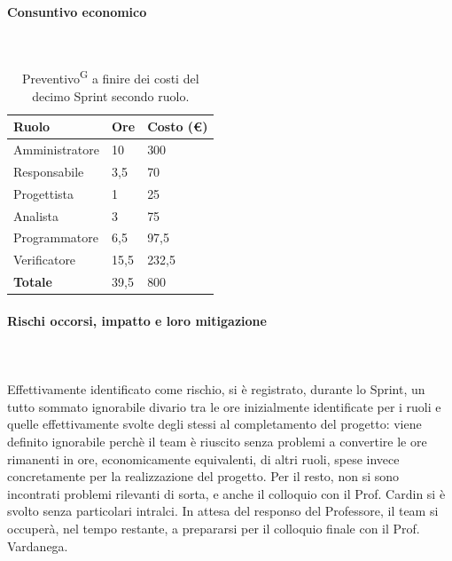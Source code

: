\documentclass[8pt]{article}
\newcommand{\glossterm}[1]{#1\textsuperscript{G}} %
\newcommand{\subsubsubsection}[1]{\paragraph{#1}\mbox{}\\}
\begin{document}
\subsubsubsection{Consuntivo economico}
\begin{table}[ht!]
    \centering
    \begin{tabular}{p{4cm} p{1.8cm} p{2.2cm}}
        \toprule
        \textbf{Ruolo} & \textbf{Ore} & \textbf{Costo (€)} \\
        \midrule
        Amministratore & 10 & 300 \\ 
        Responsabile & 3,5 & 70 \\ 
        Progettista & 1 & 25 \\ 
        Analista & 3 &75 \\ 
        Programmatore & 6,5 & 97,5 \\ 
        Verificatore & 15,5 & 232,5 \\
        \midrule 
        \textbf{Totale} & 39,5 & 800 \\ 
        \bottomrule
    \end{tabular}
    \caption{\glossterm{Preventivo} a finire dei costi del decimo Sprint secondo ruolo.}
    \label{table:Preventivo a finire dei costi del decimo Sprint secondo ruolo}
\end{table}
\subsubsubsection{Rischi occorsi, impatto e loro mitigazione} \\
Effettivamente identificato come rischio, si è registrato, durante lo Sprint, un tutto sommato ignorabile divario tra le ore inizialmente identificate per i ruoli e quelle effettivamente svolte degli stessi al completamento del progetto: viene definito ignorabile perchè il team è riuscito senza problemi a convertire le ore rimanenti in ore, economicamente equivalenti, di altri ruoli, spese invece concretamente per la realizzazione del progetto. Per il resto, non si sono incontrati problemi rilevanti di sorta, e anche il colloquio con il Prof. Cardin si è svolto senza particolari intralci. In attesa del responso del Professore, il team si occuperà, nel tempo restante, a prepararsi per il colloquio finale con il Prof. Vardanega.
\end{document}
